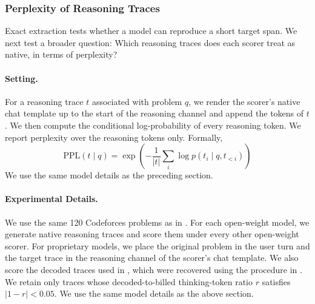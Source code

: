 \subsubsection{Perplexity of Reasoning Traces}\label{app:ppl_traces}

Exact extraction tests whether a model can reproduce a short target span. We next test a broader question: Which reasoning traces does each scorer treat as native, in terms of perplexity?

\paragraph{Setting.}
For a reasoning trace \(t\) associated with problem \(q\), we render the scorer's native chat template up to the start of the reasoning channel and append the tokens of \(t\). We then compute the conditional log-probability of every reasoning token. We report perplexity over the reasoning tokens only. Formally,
\[
\mathrm{PPL}(t\mid q)
=
\exp\!\left(
-\frac{1}{|t|}
\sum_i
\log p(t_i\mid q,t_{<i})
\right)
\]
We use the same model details as the preceding section.

\paragraph{Experimental Details.} We use the same 120 Codeforces problems as in . For each open-weight model, we generate native reasoning traces and score them under every other open-weight scorer. For proprietary models, we place the original problem in the user turn and the target trace in the reasoning channel of the scorer's chat template. We also score the decoded traces used in , which were recovered using the procedure in . We retain only traces whose decoded-to-billed thinking-token ratio \(r\) satisfies $\mid 1−r \mid <0.05$. We use the same model details as the above section.


